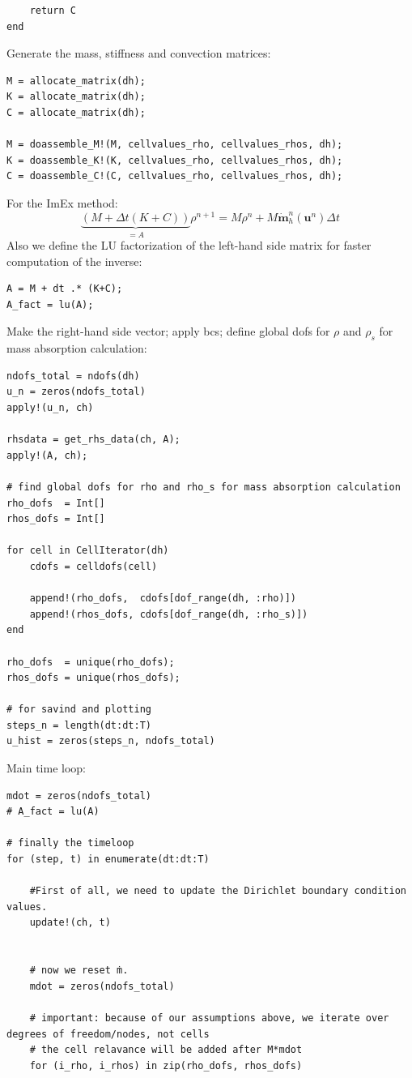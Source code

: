 \begin{appendices}
\begin{lstlisting}
    return C
end    
\end{lstlisting}
Generate the mass, stiffness and convection matrices:
\begin{lstlisting}
M = allocate_matrix(dh);
K = allocate_matrix(dh);
C = allocate_matrix(dh);

M = doassemble_M!(M, cellvalues_rho, cellvalues_rhos, dh);
K = doassemble_K!(K, cellvalues_rho, cellvalues_rhos, dh);
C = doassemble_C!(C, cellvalues_rho, cellvalues_rhos, dh);
\end{lstlisting}
For the ImEx method:
\begin{equation}
    \underbrace{\left(M + \Delta t(K+C)\right)}_{=A} \rho^{n+1} = M \rho^n + M\dot{\mathbf{m}}_h^n(\mathbf{u}^n)\Delta t
\end{equation}
Also we define the LU factorization of the left-hand side matrix for faster computation of the inverse:
\begin{lstlisting}
A = M + dt .* (K+C);
A_fact = lu(A);
\end{lstlisting}
Make the right-hand side vector; apply bcs; define global dofs for $\rho$ and $\rho_s$ for mass absorption calculation:
\begin{lstlisting}
ndofs_total = ndofs(dh)
u_n = zeros(ndofs_total)
apply!(u_n, ch)

rhsdata = get_rhs_data(ch, A);
apply!(A, ch);

# find global dofs for rho and rho_s for mass absorption calculation
rho_dofs  = Int[]
rhos_dofs = Int[]

for cell in CellIterator(dh)
    cdofs = celldofs(cell)

    append!(rho_dofs,  cdofs[dof_range(dh, :rho)])
    append!(rhos_dofs, cdofs[dof_range(dh, :rho_s)])
end

rho_dofs  = unique(rho_dofs);
rhos_dofs = unique(rhos_dofs);

# for savind and plotting
steps_n = length(dt:dt:T)
u_hist = zeros(steps_n, ndofs_total)
\end{lstlisting}
Main time loop:
\begin{lstlisting}
mdot = zeros(ndofs_total)
# A_fact = lu(A)

# finally the timeloop
for (step, t) in enumerate(dt:dt:T)
    
    #First of all, we need to update the Dirichlet boundary condition values.
    update!(ch, t)


    # now we reset ̇m.
    mdot = zeros(ndofs_total)

    # important: because of our assumptions above, we iterate over degrees of freedom/nodes, not cells
    # the cell relavance will be added after M*mdot
    for (i_rho, i_rhos) in zip(rho_dofs, rhos_dofs)


\end{lstlisting}
\end{appendices}
